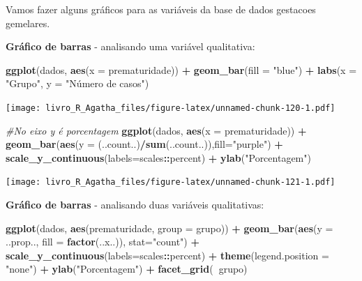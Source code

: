 \documentclass[
]{book}
\newenvironment{Shaded}{\begin{snugshade}}{\end{snugshade}}
\newcommand{\CommentTok}[1]{\textcolor[rgb]{0.56,0.35,0.01}{\textit{#1}}}
\newcommand{\DataTypeTok}[1]{\textcolor[rgb]{0.13,0.29,0.53}{#1}}
\newcommand{\KeywordTok}[1]{\textcolor[rgb]{0.13,0.29,0.53}{\textbf{#1}}}
\newcommand{\NormalTok}[1]{#1}
\newcommand{\OperatorTok}[1]{\textcolor[rgb]{0.81,0.36,0.00}{\textbf{#1}}}
\newcommand{\StringTok}[1]{\textcolor[rgb]{0.31,0.60,0.02}{#1}}
\begin{document}
Vamos fazer alguns gráficos para as variáveis da base de dados gestacoes gemelares.

\textbf{Gráfico de barras} - analisando uma variável qualitativa:

\begin{Shaded}
\begin{Highlighting}[]
\KeywordTok{ggplot}\NormalTok{(dados, }\KeywordTok{aes}\NormalTok{(}\DataTypeTok{x =}\NormalTok{ prematuridade)) }\OperatorTok{+}
\StringTok{  }\KeywordTok{geom_bar}\NormalTok{(}\DataTypeTok{fill =} \StringTok{"blue"}\NormalTok{) }\OperatorTok{+}
\StringTok{  }\KeywordTok{labs}\NormalTok{(}\DataTypeTok{x =} \StringTok{"Grupo"}\NormalTok{, }\DataTypeTok{y =} \StringTok{"Número de casos"}\NormalTok{)}
\end{Highlighting}
\end{Shaded}

\texttt{[image: livro\_R\_Agatha\_files/figure-latex/unnamed-chunk-120-1.pdf]}

\begin{Shaded}
\begin{Highlighting}[]
\CommentTok{#No eixo y é porcentagem}
\KeywordTok{ggplot}\NormalTok{(dados, }\KeywordTok{aes}\NormalTok{(}\DataTypeTok{x =}\NormalTok{ prematuridade)) }\OperatorTok{+}\StringTok{  }
\StringTok{  }\KeywordTok{geom_bar}\NormalTok{(}\KeywordTok{aes}\NormalTok{(}\DataTypeTok{y =}\NormalTok{ (..count..)}\OperatorTok{/}\KeywordTok{sum}\NormalTok{(..count..)),}\DataTypeTok{fill=}\StringTok{"purple"}\NormalTok{) }\OperatorTok{+}\StringTok{ }
\StringTok{  }\KeywordTok{scale_y_continuous}\NormalTok{(}\DataTypeTok{labels=}\NormalTok{scales}\OperatorTok{::}\NormalTok{percent) }\OperatorTok{+}
\StringTok{  }\KeywordTok{ylab}\NormalTok{(}\StringTok{"Porcentagem"}\NormalTok{)}
\end{Highlighting}
\end{Shaded}

\texttt{[image: livro\_R\_Agatha\_files/figure-latex/unnamed-chunk-121-1.pdf]}

\textbf{Gráfico de barras} - analisando duas variáveis qualitativas:

\begin{Shaded}
\begin{Highlighting}[]
\KeywordTok{ggplot}\NormalTok{(dados, }\KeywordTok{aes}\NormalTok{(prematuridade, }\DataTypeTok{group =}\NormalTok{ grupo)) }\OperatorTok{+}\StringTok{ }
\StringTok{  }\KeywordTok{geom_bar}\NormalTok{(}\KeywordTok{aes}\NormalTok{(}\DataTypeTok{y =}\NormalTok{ ..prop.., }\DataTypeTok{fill =} \KeywordTok{factor}\NormalTok{(..x..)), }\DataTypeTok{stat=}\StringTok{"count"}\NormalTok{) }\OperatorTok{+}\StringTok{ }
\StringTok{  }\KeywordTok{scale_y_continuous}\NormalTok{(}\DataTypeTok{labels=}\NormalTok{scales}\OperatorTok{::}\NormalTok{percent) }\OperatorTok{+}
\StringTok{  }\KeywordTok{theme}\NormalTok{(}\DataTypeTok{legend.position =} \StringTok{"none"}\NormalTok{) }\OperatorTok{+}
\StringTok{  }\KeywordTok{ylab}\NormalTok{(}\StringTok{"Porcentagem"}\NormalTok{) }\OperatorTok{+}
\StringTok{  }\KeywordTok{facet_grid}\NormalTok{(}\OperatorTok{~}\NormalTok{grupo)}
\end{Highlighting}
\end{Shaded}
\end{document}
